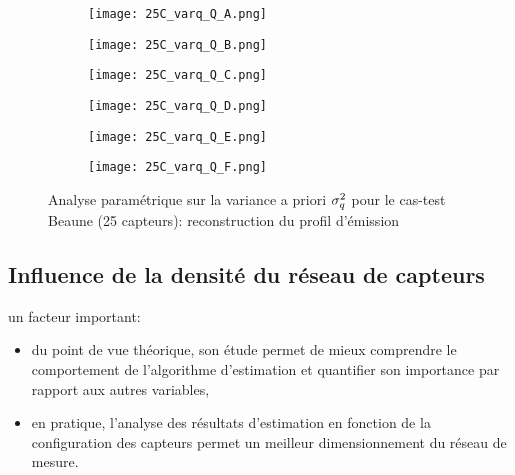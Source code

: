 \begin{figure}[p!]
	\centering
	\begin{subfigure}[t]{0.5\textwidth}
		\centering
		\texttt{[image: 25C\_varq\_Q\_A.png]}
		\caption{}
		\label{varq_A_q}
	\end{subfigure}%
	\begin{subfigure}[t]{0.5\textwidth}
		\centering
		\texttt{[image: 25C\_varq\_Q\_B.png]}
		\caption{}
		\label{varq_B_q}
	\end{subfigure}
	\begin{subfigure}[t]{0.5\textwidth}
		\centering
		\texttt{[image: 25C\_varq\_Q\_C.png]}
		\caption{}
		\label{varq_C_q}
	\end{subfigure}%
	\begin{subfigure}[t]{0.5\textwidth}
		\centering
		\texttt{[image: 25C\_varq\_Q\_D.png]}
		\caption{}
		\label{varq_D_q}
	\end{subfigure}
	\begin{subfigure}[t]{0.5\textwidth}
		\centering
		\texttt{[image: 25C\_varq\_Q\_E.png]}
		\caption{}
		\label{varq_E_q}
	\end{subfigure}%
	\begin{subfigure}[t]{0.5\textwidth}
		\centering
		\texttt{[image: 25C\_varq\_Q\_F.png]}
		\caption{}
		\label{varq_F_q}
	\end{subfigure}
	\caption{Analyse paramétrique sur la variance a priori $\sigma_q^2$ pour le cas-test Beaune (25 capteurs): reconstruction du profil d'émission}
	\label{fig_25C_analyse_varq_q}
\end{figure}



\subsection{Influence de la densité du réseau de capteurs}

 un facteur important: 

\begin{itemize}
	\item du point de vue théorique, son étude permet de mieux comprendre le comportement de l'algorithme d'estimation et quantifier son importance par rapport aux autres variables,
	\item en pratique, l'analyse des résultats d'estimation en fonction de la configuration des capteurs permet un meilleur dimensionnement du réseau de mesure.\\
\end{itemize}


